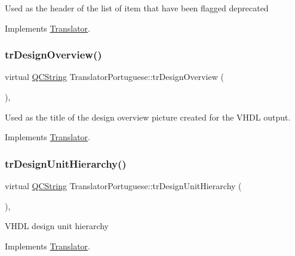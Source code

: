 Used as the header of the list of item that have been flagged deprecated 

Implements \mbox{\hyperlink{class_translator}{Translator}}.

\mbox{\label{class_translator_portuguese_a5c1776892ce021d7216fdb7c332ea48c}} 
\subsubsection{\texorpdfstring{trDesignOverview()}{trDesignOverview()}}
{\footnotesize\ttfamily virtual \mbox{\hyperlink{class_q_c_string}{Q\+C\+String}} Translator\+Portuguese\+::tr\+Design\+Overview (\begin{DoxyParamCaption}{ }\end{DoxyParamCaption})\hspace{0.3cm}{\ttfamily [inline]}, {\ttfamily [virtual]}}

Used as the title of the design overview picture created for the V\+H\+DL output. 

Implements \mbox{\hyperlink{class_translator}{Translator}}.

\mbox{\label{class_translator_portuguese_a83d761d6b31e146638793086c045a92e}} 
\subsubsection{\texorpdfstring{trDesignUnitHierarchy()}{trDesignUnitHierarchy()}}
{\footnotesize\ttfamily virtual \mbox{\hyperlink{class_q_c_string}{Q\+C\+String}} Translator\+Portuguese\+::tr\+Design\+Unit\+Hierarchy (\begin{DoxyParamCaption}{ }\end{DoxyParamCaption})\hspace{0.3cm}{\ttfamily [inline]}, {\ttfamily [virtual]}}

V\+H\+DL design unit hierarchy 

Implements \mbox{\hyperlink{class_translator}{Translator}}.

\mbox{\label{class_translator_portuguese_aa1916bf02d73b518c8859c4caf91ecbc}} 

